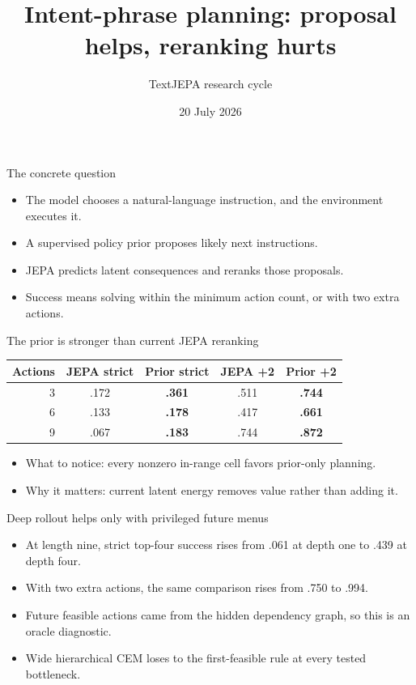 \documentclass[aspectratio=169]{beamer}
\title{Intent-phrase planning: proposal helps, reranking hurts}
\author{TextJEPA research cycle}
\date{20 July 2026}
\begin{document}
\frame{\titlepage}

\begin{frame}{The concrete question}
\begin{itemize}
\item The model chooses a natural-language instruction, and the environment executes it.
\item A supervised policy prior proposes likely next instructions.
\item JEPA predicts latent consequences and reranks those proposals.
\item Success means solving within the minimum action count, or with two extra actions.
\end{itemize}
\end{frame}

\begin{frame}{The prior is stronger than current JEPA reranking}
\centering
\begin{tabular}{rcccc}
\toprule
Actions & JEPA strict & Prior strict & JEPA +2 & Prior +2\\
\midrule
3 & .172 & \textbf{.361} & .511 & \textbf{.744}\\
6 & .133 & \textbf{.178} & .417 & \textbf{.661}\\
9 & .067 & \textbf{.183} & .744 & \textbf{.872}\\
\bottomrule
\end{tabular}
\vspace{1em}

\begin{itemize}
\item What to notice: every nonzero in-range cell favors prior-only planning.
\item Why it matters: current latent energy removes value rather than adding it.
\end{itemize}
\end{frame}

\begin{frame}{Deep rollout helps only with privileged future menus}
\begin{itemize}
\item At length nine, strict top-four success rises from .061 at depth one to .439 at depth four.
\item With two extra actions, the same comparison rises from .750 to .994.
\item Future feasible actions came from the hidden dependency graph, so this is an oracle diagnostic.
\item Wide hierarchical CEM loses to the first-feasible rule at every tested bottleneck.
\end{itemize}
\end{frame}
\end{document}
